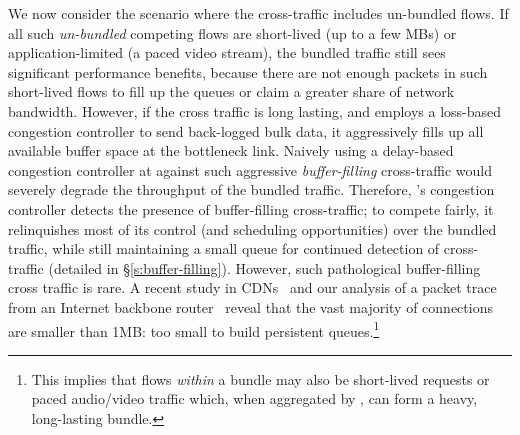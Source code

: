 \vspace{2pt}
 We now consider the scenario where the cross-traffic includes un-bundled flows. If all such \emph{un-bundled} competing flows are short-lived (up to a few MBs) or application-limited (\eg a paced video stream), the bundled traffic still sees significant performance benefits, because there are not enough packets in such short-lived flows to fill up the queues or claim a greater share of network bandwidth.
However, if the cross traffic is long lasting, and employs a loss-based congestion controller to send back-logged bulk data, it aggressively fills up all available buffer space at the bottleneck link. Naively using a delay-based congestion controller at \name against such aggressive \emph{buffer-filling} cross-traffic would severely degrade the throughput of the bundled traffic. Therefore, \name's congestion controller detects the presence of buffer-filling cross-traffic;
to compete fairly, it relinquishes most of its control (and scheduling opportunities) over the bundled traffic, while still maintaining a small queue for continued detection of cross-traffic (detailed in \S\ref{s:buffer-filling}). 
However, such pathological buffer-filling cross traffic is rare.
A recent study in CDNs~\cite{akamai-cdn-trace} and our analysis of a packet trace from an Internet backbone router~\cite{caida-dataset} reveal that the vast majority of connections are smaller than 1MB: too small to build persistent queues.\footnote{This implies that flows \emph{within} a bundle may also be short-lived requests or paced audio/video traffic which, when aggregated by \name, can form a heavy, long-lasting bundle.} 
